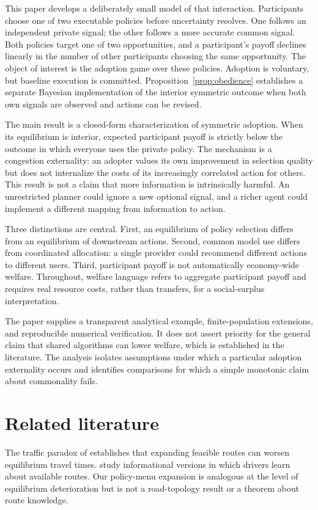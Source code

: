 \documentclass[11pt,a4paper]{article}
\theoremstyle{definition}
\theoremstyle{remark}
\begin{document}
This paper develops a deliberately small model of that interaction. Participants choose one of two executable policies before uncertainty resolves. One follows an independent private signal; the other follows a more accurate common signal. Both policies target one of two opportunities, and a participant's payoff declines linearly in the number of other participants choosing the same opportunity. The object of interest is the adoption game over these policies. Adoption is voluntary, but baseline execution is committed. Proposition~\ref{prop:obedience} establishes a separate Bayesian implementation of the interior symmetric outcome when both own signals are observed and actions can be revised.

The main result is a closed-form characterization of symmetric adoption. When its equilibrium is interior, expected participant payoff is strictly below the outcome in which everyone uses the private policy. The mechanism is a congestion externality: an adopter values its own improvement in selection quality but does not internalize the costs of its increasingly correlated action for others. This result is not a claim that more information is intrinsically harmful. An unrestricted planner could ignore a new optional signal, and a richer agent could implement a different mapping from information to action.

Three distinctions are central. First, an equilibrium of policy selection differs from an equilibrium of downstream actions. Second, common model use differs from coordinated allocation: a single provider could recommend different actions to different users. Third, participant payoff is not automatically economy-wide welfare. Throughout, welfare language refers to aggregate participant payoff and requires real resource costs, rather than transfers, for a social-surplus interpretation.

The paper supplies a transparent analytical example, finite-population extensions, and reproducible numerical verification. It does not assert priority for the general claim that shared algorithms can lower welfare, which is established in the literature. The analysis isolates assumptions under which a particular adoption externality occurs and identifies comparisons for which a simple monotonic claim about commonality fails.

\section{Related literature}
The traffic paradox of \citet{braess2005} establishes that expanding feasible routes can worsen equilibrium travel times. \citet{acemoglu2018} study informational versions in which drivers learn about available routes. Our policy-menu expansion is analogous at the level of equilibrium deterioration but is not a road-topology result or a theorem about route knowledge.
\end{document}
